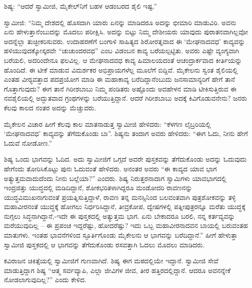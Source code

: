 ಶಿಷ್ಯ: “ಆದರೆ ಸ್ವಾಮೀಜಿ, ಮೈಕೇಲ್‌ನಿಗೆ ಬಹಳ ಆಡಂಬರದ ಶೈಲಿ ಇಷ್ಟ.” 

 ಸ್ವಾಮೀಜಿ: “ನಿಮ್ಮ ದೇಶದಲ್ಲಿ ಹೊಸದಾಗಿ ಯಾರು ಏನನ್ನು ಮಾಡಿದರೂ ಅದನ್ನು ಛೀಮಾರಿ ಮಾಡುವಿರಿ. ಅವನು ಏನು ಹೇಳುತ್ತಾನೆಂಬುದನ್ನು ಮೊದಲು ಪರೀಕ್ಷಿಸಿ. ಅದನ್ನು ಬಿಟ್ಟು ನಿಮ್ಮ ದೇಶೀಯರು ಯಾವುದು ಪುರಾತನವಾಗಿಲ್ಲವೋ ಅದನ್ನೆಲ್ಲಾ ತುಚ್ಛೀಕರಿಸುವರು. ಉದಾಹರಣೆಗೆ ಬಂಗಾಳಿ ಸಾಹಿತ್ಯದ ಶಿರೋರತ್ನವಾದ ಈ ‘ಮೇಘನಾದವಧ’ ಕಾವ್ಯವನ್ನು ಹಳಿಯುವುದಕ್ಕೋಸ್ಕರವೇ “ಚುಚುಂದರವಧ” ಎಂಬ ವಿಡಂಬನ ಕಾವ್ಯ ಬರೆಯಲ್ಪಟ್ಟಿತು. ಅವರು ಎಷ್ಟೇ ವ್ಯಂಗ್ಯವಾಗಿ ಬರೆಯಲಿ, ಅದರಿಂದೇನೂ ಫಲವಿಲ್ಲ. ಆ ಮೇಘನಾದವಧ ಕಾವ್ಯ ಹಿಮಾಲಯದಂತೆ ಆಚಂದ್ರಾರ್ಕವಾದ ಕೀರ್ತಿಯನ್ನು ಹೊಂದಿದೆ. ಈ ಟೀಕೆ ಮಾಡುವ ವಿಮರ್ಶಕರ ಅಭಿಪ್ರಾಯಗಳೆಲ್ಲ ಮೂಲೆಗೆ ಬಿದ್ದಿವೆ. ಮೈಕೇಲನು ಸ್ವಂತ ಶೈಲಿಯಲ್ಲಿ ಎಂತಹ ವೀರ‍್ಯವತ್ತಾದ ಪದಪ್ರಯೋಗ ಮಾಡಿ ಈ ಮಹಾಕಾವ್ಯ ಬರೆದಿದ್ದಾನೆಂಬುದು ಜನಸಾಮಾನ್ಯರಿಗೆ ಹೇಗೆ ತಾನೆ ಗೊತ್ತಾಗುವುದು? ಈಗ ತಾನೆ ಗಿರೀಶಬಾಬು ನಿಮ್ಮ ಪಂಡಿತರು ಅಷ್ಟೊಂದು ಅವಹೇಳನ ಮಾಡಿ ಟೀಕಿಸುತ್ತಿರುವ ಈ ನವಶೈಲಿಯಲ್ಲಿ ಅದ್ಭುತವಾದ ಗ್ರಂಥಗಳನ್ನು ಬರೆಯುತ್ತಿದ್ದಾನೆ. ಆದರೆ ಗಿರೀಶಬಾಬು ಅದಕ್ಕೆ ಕಿವಿಗೊಡುವನೇನು? ಜನರು ಕೆಲವು ಕಾಲದ ನಂತರ ಅದನ್ನು ಮೆಚ್ಚುವರು. 

 ಮೈಕೇಲನ ವಿಚಾರ ಹೀಗೆ ಕೆಲವು ಕಾಲ ಮಾತನಾಡುತ್ತ ಸ್ವಾಮೀಜಿ ಹೇಳಿದರು: “ಕೆಳಗಣ ಲೈಬ್ರರಿಯಲ್ಲಿ ‘ಮೇಘನಾದವಧ’ ಕಾವ್ಯವನ್ನು ತೆಗೆದುಕೊಂಡು ಬಾ”. ಶಿಷ್ಯನು ತಂದಾಗ ಅವರು ಹೇಳಿದರು: “ಈಗ ಓದು, ನೀನು ಹೇಗೆ ಓದುವೆ ನೋಡೋಣ.” 

 ಶಿಷ್ಯ ಒಂದು ಭಾಗವನ್ನು ಓದಿದ. ಅದು ಸ್ವಾಮೀಜಿಗೆ ಒಗ್ಗದೆ ಅವರೇ ಪುಸ್ತಕವನ್ನು ತೆಗೆದುಕೊಂಡು ಅದನ್ನು ಓದುವುದು ಹೇಗೆಂದು ತೋರಿಸಿಕೊಟ್ಟು ಪುನಃ ಓದುವಂತೆ ಹೇಳಿದರು. ಅನಂತರ ಅವರು “ಈ ಕಾವ್ಯದ ಯಾವ ಭಾಗ ಅತ್ಯುತ್ತಮವಾದುದೆಂದು ನೀನು ಬಲ್ಲೆಯಾ?” ಎಂದರು. ಶಿಷ್ಯ ನಿರುತ್ತರನಾದಾಗ ಸ್ವಾಮಿಗಳು ಯಾವಭಾಗದಲ್ಲಿ ಇಂದ್ರಜಿತ್ತು ಯುದ್ಧದಲ್ಲಿ ಮಡಿದಿದ್ದಾನೆ, ಶೋಕಭರಿತಳಾಗಿದ್ದರೂ ಮಂಡೋದರಿ ರಾವಣನನ್ನು ಯುದ್ಧವಿಮುಖನಾಗುವಂತೆ ಪ್ರಯತ್ನಿಸುತ್ತಿದ್ದಾಳೆ, ರಾವಣ ತನ್ನ ಮನಸ್ಸಿನಿಂದ ಬಲವಂತವಾಗಿ ಪುತ್ರಶೋಕವನ್ನು ತಳ್ಳಿ ಮಹಾವೀರನಂತೆ ಯುದ್ಧಕ್ಕೆ ಹೋಗಲು ನಿರ್ಧರಿಸಿದ್ದಾನೆ, ತೀವ್ರಕೋಪ, ದ್ವೇಷಗಳಲ್ಲಿ ಪತ್ನೀಪುತ್ರರನ್ನೂ ಮರೆತು ಯುದ್ಧಕ್ಕೆ ನುಗ್ಗಲು ಸಿದ್ಧನಾಗಿದ್ದಾನೆ,\break -ಇದೇ ಈ ಪುಸ್ತಕದಲ್ಲಿ ಅತ್ಯುತ್ತಮ ಭಾಗ. ಏನು ಬೇಕಾದರೂ ಬರಲಿ, ನನ್ನ ಕರ್ತವ್ಯವನ್ನು ಮರೆಯುವುದಿಲ್ಲ – ಈ ಪ್ರಪಂಚ ಇದ್ದರೆಷ್ಟು, ಹೋದರೆಷ್ಟು? ಇದು ಒಬ್ಬ ಮಹಾವೀರನಾದವನ ಬಾಯಲ್ಲಿ ಬರುವಂತಹ ಮಾತುಗಳು. ಇಂತಹ ಭಾವನೆಗಳಿಂದ ಸ್ಫೂರ್ತಿಗೊಂಡು ಮೈಕೇಲನು ಆ ಭಾಗವನ್ನು ಬರೆದಿದ್ದಾನೆ.” ಹೀಗೆ ಹೇಳುತ್ತಾ ಸ್ವಾಮೀಜಿ ಪುಸ್ತಕದಲ್ಲಿ ಆ ಭಾಗವನ್ನು ತೆಗೆದುಕೊಂಡು ರಸವತ್ತಾಗಿ ಓದಲು ಮೊದಲು ಮಾಡಿದರು. 

\delimiter

 ಕವಿರಾಜನ ಚಿಕಿತ್ಸೆಯಲ್ಲಿ ಸ್ವಾಮೀಜಿಗೆ ಗುಣವಾಗಿದೆ. ಶಿಷ್ಯ ಈಗ ಮಠದಲ್ಲಿಯೇ ಇದ್ದಾನೆ. ಸ್ವಾಮೀಜಿ ಸೇವೆ ಮಾಡುತ್ತಿದ್ದಾಗ ಶಿಷ್ಯ “ಆತ್ಮ ಸರ್ವವ್ಯಾಪಿ, ಎಲ್ಲಾ ಜೀವಿಗಳ ಜೀವ, ತೀರ ಹತ್ತಿರದಲ್ಲಿದ್ದಾನೆ. ಆದರೂ ಅವನನ್ನೇಕೆ ನೋಡಲಾಗುವುದಿಲ್ಲ?” ಎಂದು ಕೇಳಿದ. 

